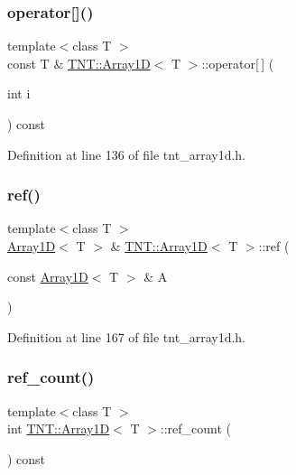 \subsubsection{\texorpdfstring{operator[]()}{operator[]()}\hspace{0.1cm}{\footnotesize\ttfamily [2/2]}}
{\footnotesize\ttfamily template$<$class T $>$ \\
const T \& \hyperlink{classTNT_1_1Array1D}{T\+N\+T\+::\+Array1D}$<$ T $>$\+::operator\mbox{[}$\,$\mbox{]} (\begin{DoxyParamCaption}\item[{int}]{i }\end{DoxyParamCaption}) const\hspace{0.3cm}{\ttfamily [inline]}}



Definition at line 136 of file tnt\+\_\+array1d.\+h.

\mbox{\label{classTNT_1_1Array1D_a908c5381a74bcb1f50d47b37327265ae}} 
\subsubsection{\texorpdfstring{ref()}{ref()}}
{\footnotesize\ttfamily template$<$class T $>$ \\
\hyperlink{classTNT_1_1Array1D}{Array1D}$<$ T $>$ \& \hyperlink{classTNT_1_1Array1D}{T\+N\+T\+::\+Array1D}$<$ T $>$\+::ref (\begin{DoxyParamCaption}\item[{const \hyperlink{classTNT_1_1Array1D}{Array1D}$<$ T $>$ \&}]{A }\end{DoxyParamCaption})\hspace{0.3cm}{\ttfamily [inline]}}



Definition at line 167 of file tnt\+\_\+array1d.\+h.

\mbox{\label{classTNT_1_1Array1D_a359ce42de82885374ef0468e7ab14389}} 
\subsubsection{\texorpdfstring{ref\+\_\+count()}{ref\_count()}}
{\footnotesize\ttfamily template$<$class T $>$ \\
int \hyperlink{classTNT_1_1Array1D}{T\+N\+T\+::\+Array1D}$<$ T $>$\+::ref\+\_\+count (\begin{DoxyParamCaption}{ }\end{DoxyParamCaption}) const\hspace{0.3cm}{\ttfamily [inline]}}




